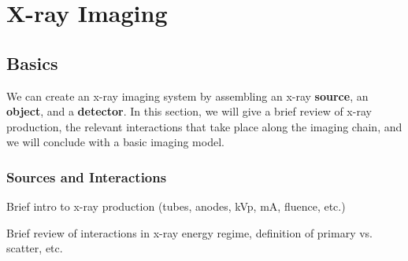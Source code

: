 \documentclass[mphy386-notes.tex]{subfiles}
\begin{document}
\section{X-ray Imaging}
\subsection{Basics}
We can create an x-ray imaging system by assembling an x-ray \textbf{source}, an
\textbf{object}, and a \textbf{detector}. In this section, we will give a brief
review of x-ray production, the relevant interactions that take place along
the imaging chain, and we will conclude with a basic imaging model.

\subsubsection{Sources and Interactions}
Brief intro to x-ray production (tubes, anodes, kVp, mA, fluence, etc.)

Brief review of interactions in x-ray energy regime, definition of
primary vs. scatter, etc. 
\end{document}
